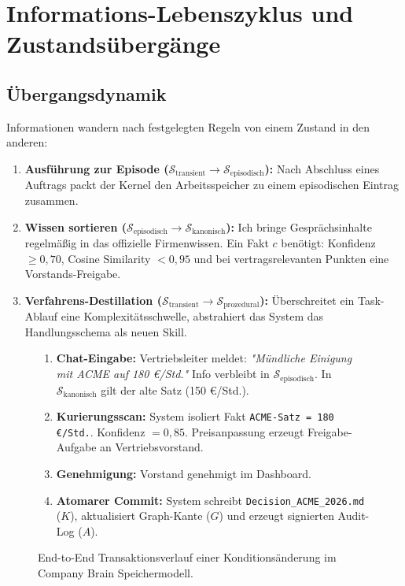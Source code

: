 \documentclass[10pt,journal,compsoc]{IEEEtran}
\begin{document}
\section{Informations-Lebenszyklus und Zustandsübergänge}
\label{sec:lebenszyklus}

\subsection{Übergangsdynamik}
Informationen wandern nach festgelegten Regeln von einem Zustand in den anderen:
\begin{enumerate}
    \item \textbf{Ausführung zur Episode ($\mathcal{S}_{\text{transient}} \rightarrow \mathcal{S}_{\text{episodisch}}$):} Nach Abschluss eines Auftrags packt der Kernel den Arbeitsspeicher zu einem episodischen Eintrag zusammen.
    \item \textbf{Wissen sortieren ($\mathcal{S}_{\text{episodisch}} \rightarrow \mathcal{S}_{\text{kanonisch}}$):} Ich bringe Gesprächsinhalte regelmäßig in das offizielle Firmenwissen. Ein Fakt $c$ benötigt: Konfidenz $\ge 0{,}70$, Cosine Similarity $< 0{,}95$ und bei vertragsrelevanten Punkten eine Vorstands-Freigabe.
    \item \textbf{Verfahrens-Destillation ($\mathcal{S}_{\text{transient}} \rightarrow \mathcal{S}_{\text{prozedural}}$):} Überschreitet ein Task-Ablauf eine Komplexitätsschwelle, abstrahiert das System das Handlungsschema als neuen Skill.
\end{enumerate}

\begin{figure}[h]
\centering
\begin{tcolorbox}[colback=blue!5!white,colframe=blue!75!black,title=\textbf{Fallstudie: Preisanpassung im Kundenkonto}]
\begin{enumerate}
    \item \textbf{Chat-Eingabe:} Vertriebsleiter meldet: \emph{"Mündliche Einigung mit ACME auf 180 €/Std."} Info verbleibt in $\mathcal{S}_{\text{episodisch}}$. In $\mathcal{S}_{\text{kanonisch}}$ gilt der alte Satz (150 €/Std.).
    \item \textbf{Kurierungsscan:} System isoliert Fakt \texttt{ACME-Satz = 180 €/Std.}. Konfidenz $= 0{,}85$. Preisanpassung erzeugt Freigabe-Aufgabe an Vertriebsvorstand.
    \item \textbf{Genehmigung:} Vorstand genehmigt im Dashboard.
    \item \textbf{Atomarer Commit:} System schreibt \texttt{Decision\_ACME\_2026.md} ($K$), aktualisiert Graph-Kante ($G$) und erzeugt signierten Audit-Log ($A$).
\end{enumerate}
\end{tcolorbox}
\caption{End-to-End Transaktionsverlauf einer Konditionsänderung im Company Brain Speichermodell.}
\label{fig:fallstudie}
\end{figure}
\end{document}
